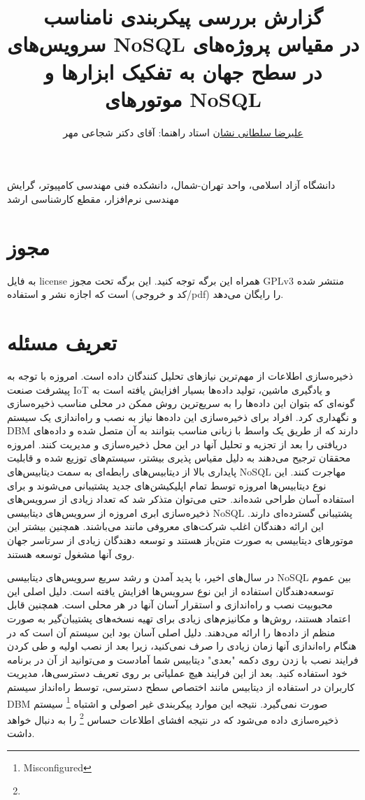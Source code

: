 \documentclass[10pt, a4paper]{article}
\title{گزارش بررسی پیکربندی نامناسب سرویس‌های NoSQL در مقیاس پروژه‌های در سطح
جهان به تفکیک ابزار‌ها و موتور‌های NoSQL}
\author{\href{mailto:a.soltani@iau-tnb.ac.ir}{علیرضا سلطانی نشان} \small{استاد
راهنما: آقای دکتر شجاعی مهر}}
\begin{document}
\maketitle

دانشگاه آزاد اسلامی، واحد تهران-شمال، دانشکده فنی مهندسی کامپیوتر، گرایش مهندسی
نرم‌افزار، مقطع کارشناسی ارشد

\section{مجوز}

به فایل license همراه این برگه توجه کنید. این برگه تحت مجوز GPLv3 منتشر شده است
که اجازه نشر و استفاده (کد و خروجی/pdf) را رایگان می‌دهد.

\section{تعریف مسئله}

ذخیره‌سازی اطلاعات از مهم‌ترین نیاز‌های تحلیل کنندگان داده است. امروزه با توجه
به پیشرفت صنعت IoT و یادگیری ماشین، تولید داده‌ها بسیار افزایش یافته است به
گونه‌ای که بتوان این داده‌ها را به سریع‌ترین روش ممکن در محلی مناسب ذخیره‌سازی و
نگهداری کرد.  افراد برای ذخیره‌سازی این داده‌ها نیاز به نصب و راه‌اندازی یک
سیستم DBM دارند که از طریق یک واسط با زبانی مناسب بتوانند به آن متصل شده و
داده‌های دریافتی را بعد از تجزیه و تحلیل آنها در این محل ذخیره‌سازی و مدیریت
کنند. امروزه محققان ترجیح می‌دهند به دلیل مقیاس پذیری بیشتر، سیستم‌های توزیع شده
و قابلیت پایداری بالا از دیتابیس‌های رابطه‌ای به سمت دیتابیس‌های NoSQL مهاجرت
کنند.  این نوع دیتابیس‌ها امروزه توسط تمام اپلیکیشن‌های جدید پشتیبانی می‌شوند و
برای استفاده آسان طراحی شده‌اند. حتی می‌توان متذکر شد که تعداد زیادی از
سرویس‌های ذخیره‌سازی ابری امروزه‌ از سرویس‌های دیتابیسی NoSQL پشتیبانی گسترده‌ای
دارند. این ارائه دهندگان اغلب شرکت‌های معروفی مانند 
  می‌باشند. همچنین بیشتر این
موتور‌های دیتابیسی به صورت متن‌باز هستند و توسعه دهندگان زیادی از سرتاسر جهان
روی آنها مشغول توسعه هستند.

در سال‌های اخیر، با پدید آمدن و رشد سریع سرویس‌های دیتابیسی NoSQL بین عموم
توسعه‌دهندگان استفاده از این نوع سرویس‌ها افزایش یافته است. دلیل اصلی این
محبوبیت نصب و راه‌اندازی و استقرار آسان آنها در هر محلی است. همچنین قابل اعتماد
هستند، روش‌ها و مکانیزم‌های زیادی برای تهیه نسخه‌های پشتیبان‌گیر به صورت منظم از
داده‌ها را ارائه می‌دهند. دلیل اصلی آسان بود این سیستم آن است که در هنگام
راه‌اندازی آنها زمان زیادی را صرف نمی‌کنید، زیرا بعد از نصب اولیه و طی کردن
فرایند نصب با زدن روی دکمه "بعدی" دیتابیس شما آمادست و می‌توانید از آن در برنامه
خود استفاده کنید. بعد از این فرایند هیچ عملیاتی بر روی تعریف دسترسی‌ها، مدیریت
کاربران در استفاده از دیتابیس مانند اختصاص سطح دسترسی، توسط راه‌انداز سیستم DBM
صورت نمی‌گیرد. نتیجه این موارد پیکربندی غیر اصولی و اشتباه
\footnote{Misconfigured} سیستم ذخیره‌سازی داده می‌شود که در نتیجه افشای اطلاعات
حساس \footnote{} را به دنبال خواهد داشت.
\end{document}
